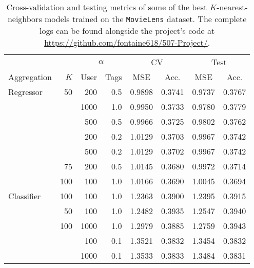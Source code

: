 \begin{table}
\centering
\begin{tabular}{lrrrcccc}
\toprule
           &     & \multicolumn{2}{c}{$\alpha$} &  \multicolumn{2}{c}{CV} & \multicolumn{2}{c}{Test} \\
           \cmidrule(lr){3-4}\cmidrule(lr){5-6}\cmidrule(l){7-8}
Aggregation & $K$ & User & Tags &  MSE & Acc. & MSE & Acc.  \\
\midrule
Regressor & 50  & 200  & 0.5 &  0.9898 &      0.3741 &   0.9737 &        0.3767 \\
           &     & 1000 & 1.0 &  0.9950 &      0.3733 &   0.9780 &        0.3779 \\
           &     & 500  & 0.5 &  0.9966 &      0.3725 &   0.9802 &        0.3762 \\
           &     & 200  & 0.2 &  1.0129 &      0.3703 &   0.9967 &        0.3742 \\
           &     & 500  & 0.2 &  1.0129 &      0.3702 &   0.9967 &        0.3742 \\
           & 75  & 200  & 0.5 &  1.0145 &      0.3680 &   0.9972 &        0.3714 \\
           & 100 & 100  & 1.0 &  1.0166 &      0.3690 &   1.0045 &        0.3694 \\
Classifier & 100 & 100  & 1.0 &  1.2363 &      0.3900 &   1.2395 &        0.3915 \\
           & 50  & 100  & 1.0 &  1.2482 &      0.3935 &   1.2547 &        0.3940 \\
           & 100 & 1000 & 1.0 &  1.2979 &      0.3885 &   1.2759 &        0.3943 \\
           &     & 100  & 0.1 &  1.3521 &      0.3832 &   1.3454 &        0.3832 \\
           &     & 1000 & 0.1 &  1.3533 &      0.3833 &   1.3484 &        0.3831 \\
\bottomrule
\end{tabular}
\caption{Cross-validation and testing metrics of some of the best $K$-nearest-neighbors models trained on the \texttt{MovieLens} dataset. The complete logs can be found alongside the project's code at \url{https://github.com/fontaine618/507-Project/}.}
\label{tab:results.knn}
\end{table}
